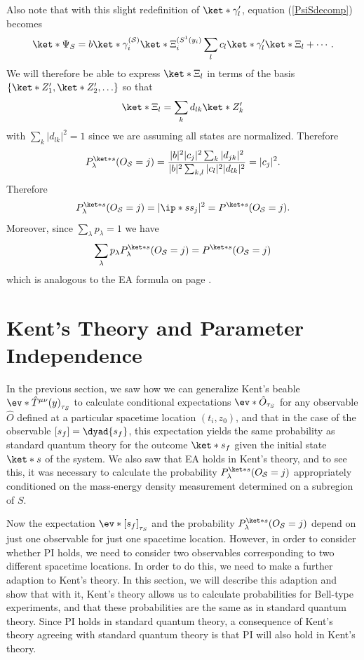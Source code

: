 \documentclass[12pt]{report}
\providecommand{\DIFadd}[1]{{\protect\color{blue}\uwave{#1}}} %
\providecommand{\DIFaddbegin}{} %
\providecommand{\DIFaddend}{} %
\begin{document}
Also note that with this slight redefinition of $\ket*{\gamma_l'}$,  equation (\ref{PsiSdecomp}) becomes
$$\ket*{\Psi_S}=b\ket*{\gamma_i^{(\mathcal{S})}}\ket*{\Xi_i^{(S^1(y_i)}}\sum_lc_l\ket*{\gamma_l'}\ket*{\Xi_l}+\cdots.$$
We will therefore be able to express
$\ket*{\Xi_l}$ in terms of the basis $\{\ket*{Z_1'}, \ket*{Z_2'},\ldots  \}$ so that 
$$\ket*{\Xi_l}= \sum_k d_{lk}\ket*{Z_k'}$$
with $\sum_{k}|d_{lk}|^2=1$ since we are assuming all states are normalized. Therefore\DIFaddbegin \DIFadd{,
}\DIFaddend $$P_\lambda^{\ket*{s}}(O_{\mathcal{S}}=j)=\frac{|b|^2|c_j|^2\sum_k |d_{jk}|^2}{|b|^2\sum_{k,l} |c_l|^2 |d_{lk}|^2}= |c_j|^2.$$
Therefore\DIFaddbegin \DIFadd{, }\DIFaddend $$P_\lambda^{\ket*{s}}(O_{\mathcal{S}}=j)=|\ip*{s}{s_j}|^2=P^{\ket*{s}}(O_{\mathcal{S}}=j).$$ Moreover, since $\sum_\lambda p_\lambda =1$ we have 
$$\sum_\lambda p_\lambda P_\lambda^{\ket*{s}}(O_{\mathcal{S}}=j)= P^{\ket*{s}}(O_{\mathcal{S}}=j)$$
which is analogous to the EA formula on page \pageref{adeq}.





\section{Kent's Theory and Parameter Independence\label{kentpi}}
  In the previous section, we saw how we can generalize Kent's beable $\ev*{\hat{T}^{\mu\nu}(y)}_{\tau_S}$ to calculate conditional expectations $\ev*{\hat{O}}_{\tau_S}$ for any observable $\hat{O}$ defined at a particular spacetime location $(t_i, z_0)$, and that in the case of the observable $[s_f]=\dyad{s_f}$, this expectation yields the same probability as standard quantum theory for the outcome $\ket*{s_f}$ given the initial state $\ket*{s}$ of the system.  We also saw that  EA holds in Kent's theory, and to see this, it was necessary to calculate the probability $P_\lambda^{\ket*{s}}(O_{\mathcal{S}}=j)$ appropriately conditioned on the mass-energy density measurement determined on a subregion of $S$. 

  Now the expectation  $\ev*{[s_f]}_{\tau_S}$ and the probability $P_\lambda^{\ket*{s}}(O_{\mathcal{S}}=j)$ depend on just one observable for just one spacetime location. However, in order to consider whether PI holds, we need to consider two observables corresponding to two different spacetime locations. In order to do this, we need to make a further adaption to Kent's theory. In this section, we will describe this adaption and show that with it, Kent's theory allows us to calculate probabilities for Bell-type experiments, and that these probabilities are the same as in standard quantum theory. Since PI holds in standard quantum theory,  a consequence of Kent's theory agreeing with standard quantum theory is that PI will also hold in Kent's theory. 
\end{document}
